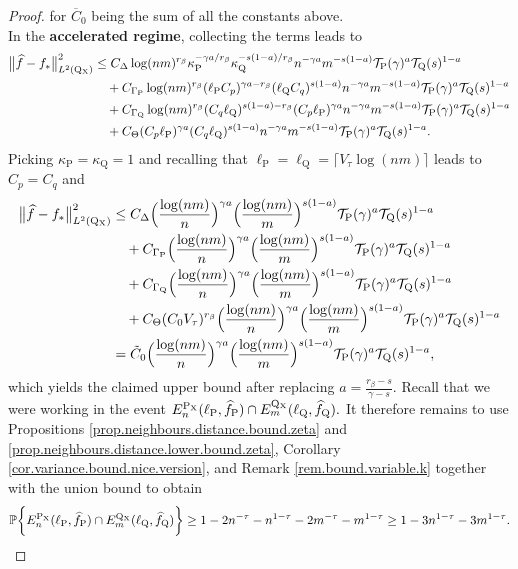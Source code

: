 \documentclass[10pt,a4paper]{amsart}
\renewcommand{\P}{\operatorname{P}}
\newcommand{\PP}{\mathbb{P}}
\newcommand{\Q}{\operatorname{Q}}
\renewcommand{\k}{\kappa}
\newcommand{\mT}{\mathcal{T}}
\newcommand{\ol}{\overline}
\newcommand{\sX}{\mathrm{X}}
\newcommand{\wh}{\widehat}
\begin{document}
\begin{proof}
    for $\ol C_0$ being the sum of all the constants above.\\
    \noindent In the \textbf{accelerated regime}, collecting the terms leads to
    \begin{align*}
        \big\|\wh f - f_*\big\|_{L^2(\Q\mathstrut_{\!\sX})}^2 &\leq C_{\Delta}\log(nm)^{r_\beta}\k_{\P}^{-\gamma a/r_{\beta}}\k_{\Q}^{-s(1 - a)/r_\beta}n^{-\gamma a}m^{-s(1- a)}\mT_{\P}(\gamma)^{a} \mT_{\Q}(s)^{1 - a}\\
        &\quad + C_{\Gamma_{\P}}\log(nm)^{r_\beta}(\ell_{\P}C_{p})^{\gamma a - r_\beta}(\ell_{\Q}C_q)^{s(1 - a)}n^{-\gamma a}m^{-s(1 - a)}\mT_{\P}(\gamma)^{a}\mT_{\Q}(s)^{1-a}\\
        &\quad + C_{\Gamma_{\Q}}\log(nm)^{r_\beta}(C_q\ell_{\Q})^{s(1 - a) - r_\beta}(C_p\ell_{\P})^{\gamma a}n^{-\gamma a}m^{-s(1 - a)}\mT_{\P}(\gamma)^{a}\mT_{\Q}(s)^{1 - a}\\
        &\quad + C_{\Theta}(C_p\ell_{\P})^{\gamma a}(C_q\ell_{\Q})^{s(1 - a)}n^{-\gamma a}m^{-s(1 - a)}\mT_{\P}(\gamma)^{a}\mT_{\Q}(s)^{1-a}.
    \end{align*}
    Picking $\k_{\P} = \k_{\Q} = 1$ and recalling that $\ell_{\P} = \ell_{\Q} = \lceil V_\tau \log(nm)\rceil$ leads to $C_p = C_q$ and
    \begin{align*}
        \big\|\wh f - f_*\big\|_{L^2(\Q\mathstrut_{\!\sX})}^2 &\leq C_{\Delta}\Big(\frac{\log(nm)}{n}\Big)^{\gamma a}\Big(\frac{\log(nm)}{m}\Big)^{s(1- a)}\mT_{\P}(\gamma)^{a} \mT_{\Q}(s)^{1 - a}\\
        &\quad + C_{\Gamma_{\P}}\Big(\frac{\log(nm)}{n}\Big)^{\gamma a}\Big(\frac{\log(nm)}{m}\Big)^{s(1- a)}\mT_{\P}(\gamma)^{a}\mT_{\Q}(s)^{1-a}\\
        &\quad + C_{\Gamma_{\Q}}\Big(\frac{\log(nm)}{n}\Big)^{\gamma a}\Big(\frac{\log(nm)}{m}\Big)^{s(1- a)}\mT_{\P}(\gamma)^{a}\mT_{\Q}(s)^{1 - a}\\
        &\quad + C_{\Theta}(C_0V_\tau)^{r_\beta}\Big(\frac{\log(nm)}{n}\Big)^{\gamma a}\Big(\frac{\log(nm)}{m}\Big)^{s(1- a)}\mT_{\P}(\gamma)^{a}\mT_{\Q}(s)^{1-a}\\
        &= \tilde C_0\Big(\frac{\log(nm)}{n}\Big)^{\gamma a}\Big(\frac{\log(nm)}{m}\Big)^{s(1- a)}\mT_{\P}(\gamma)^{a}\mT_{\Q}(s)^{1-a},
    \end{align*}
    which yields the claimed upper bound after replacing $a = \tfrac{r_\beta - s}{\gamma - s}.$ Recall that we were working in the event $E_n^{\P_{\sX}}(\ell_{\P}, \wh f_{\P}) \cap E_m^{\Q\mathstrut_{\!\sX}}(\ell_{\Q}, \wh f_{\Q}).$ It therefore remains to use Propositions \ref{prop.neighbours.distance.bound.zeta} and \ref{prop.neighbours.distance.lower.bound.zeta}, Corollary \ref{cor.variance.bound.nice.version}, and Remark \ref{rem.bound.variable.k} together with the union bound to obtain
    \begin{align*}
        \PP\bigg\{E_n^{\P_{\sX}}(\ell_{\P}, \wh f_{\P}) \cap E_m^{\Q\mathstrut_{\!\sX}}(\ell_{\Q}, \wh f_{\Q})\bigg\} \geq 1 - 2n^{-\tau} - n^{1-\tau} - 2m^{-\tau} - m^{1-\tau} \geq 1 - 3n^{1-\tau} - 3m^{1-\tau}.
    \end{align*}
\end{proof}
\end{document}
